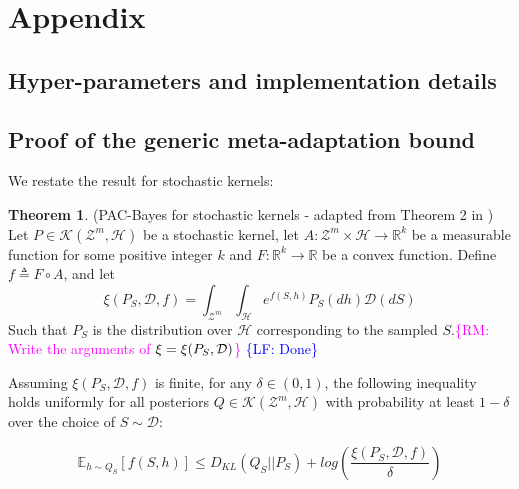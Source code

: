 \documentclass{article}
\theoremstyle{definition}
\newtheorem{theorem}{Theorem}[section]
\newcommand{\Expect}[2]{\mathbb{E}_{#1}\left [#2 \right ]}
\newcommand{\RM}[1]{\textcolor{magenta}{\{RM: #1\}}}
\newcommand{\LF}[1]{\textcolor{blue}{\{LF: #1\}}}
\begin{document}

\clearpage




\appendix
\section{Appendix}

\subsection{Hyper-parameters and implementation details} \label{append:hyper-params}

\subsection{Proof of the generic meta-adaptation bound} \label{append:proof-main-result}

We restate the result for stochastic kernels:

\begin{theorem} (PAC-Bayes for stochastic kernels - adapted from Theorem 2 in \citet{Rivasplata2020}) \label{thm:rivasplata-pb-appendix}
	Let $P\in \mathcal{K}(\mathcal{Z}^m, \mathcal{H})$ be a stochastic kernel, let $A: \mathcal{Z}^m\times \mathcal{H}\rightarrow \mathbb{R}^k$ be a measurable function for some positive integer $k$ and $F:\mathbb{R}^k\rightarrow \mathbb{R}$ be a convex function.
	Define $f\triangleq F\circ A$, and let 
	$$\xi(P_S, \mathcal{D}, f)=\int_{\mathcal{Z}^m}\int_{\mathcal{H}}e^{f(S, h)}P_S(dh)\mathcal{D}(dS)$$
	Such that $P_S$ is the distribution over $\mathcal{H}$ corresponding to the sampled $S$.\RM{Write the arguments of $\xi=\xi(P_S,{\cal D})$} \LF{Done}
	
	Assuming $\xi(P_S, \mathcal{D}, f)$ is finite, for any $\delta \in (0,1)$, the following inequality holds uniformly for all posteriors $Q\in \mathcal{K}(\mathcal{Z}^m, \mathcal{H})$ with probability at least $1-\delta$ over the choice of $S\sim \mathcal{D}$:
	
	\begin{equation} \label{eq:ribasplata-pb-appendix}
	\Expect{h\sim Q_S}{f(S, h)} \leq D_{KL}(Q_S||P_S)+log\left (\frac{\xi(P_S, \mathcal{D}, f)}{\delta}\right )
	\end{equation}
\end{theorem}
\end{document}
